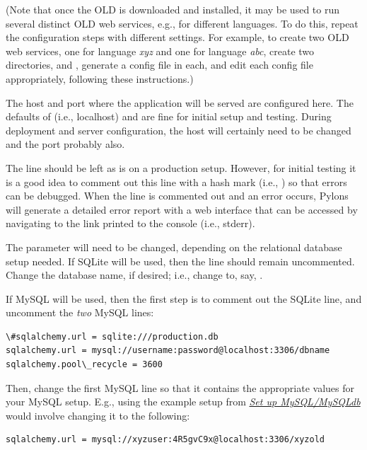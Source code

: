 \documentclass[letterpaper,10pt,english]{sphinxmanual}
\begin{document}
(Note that once the OLD is downloaded and installed, it may be used to run
several distinct OLD web services, e.g., for different languages.  To do this,
repeat the configuration steps with different settings.  For example, to create
two OLD web services, one for language \emph{xyz} and one for language \emph{abc}, create
two directories,  and , generate a config file in each, and
edit each config file appropriately, following these instructions.)

The host and port where the application will be served are configured here.
The defaults of  (i.e., localhost) and  are fine for
initial setup and testing.  During deployment and server configuration, the host
will certainly need to be changed and the port probably also.

The  line should be left as is on a production setup.
However, for initial testing it is a good idea to comment out this line with a
hash mark (i.e., ) so that errors can be debugged.  When
the line is commented out and an error occurs, Pylons will generate a detailed
error report with a web interface that can be accessed by navigating to the link
printed to the console (i.e., stderr).

The  parameter will need to be changed, depending on the
relational database setup needed.  If SQLite will be used, then the
 line should remain uncommented.
Change the database name, if desired; i.e., change  to, say,
.

If MySQL will be used, then the first step is to comment out the SQLite line,
and uncomment the \emph{two} MySQL lines:

\begin{Verbatim}[commandchars=\\\{\}]
\#sqlalchemy.url = sqlite:///production.db
sqlalchemy.url = mysql://username:password@localhost:3306/dbname
sqlalchemy.pool\_recycle = 3600
\end{Verbatim}

Then, change the first MySQL line so that it contains the appropriate values for
your MySQL setup.  E.g., using the example setup from {\hyperref[installation:mysql-config]{\emph{Set up MySQL/MySQLdb}}} would
involve changing it to the following:

\begin{Verbatim}[commandchars=\\\{\}]
sqlalchemy.url = mysql://xyzuser:4R5gvC9x@localhost:3306/xyzold
\end{Verbatim}
\end{document}
